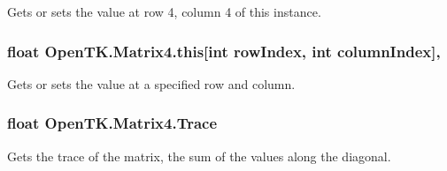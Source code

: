 Gets or sets the value at row 4, column 4 of this instance. 

\hypertarget{struct_open_t_k_1_1_matrix4_ae970446c132947e10f286d178faff5e4}{
\subsubsection[{this[int row\-Index, int column\-Index]}]{\setlength{\rightskip}{0pt plus 5cm}float Open\-T\-K.\-Matrix4.\-this\mbox{[}int row\-Index, int column\-Index\mbox{]}\hspace{0.3cm}{\ttfamily [get]}, {\ttfamily [set]}}}\label{struct_open_t_k_1_1_matrix4_ae970446c132947e10f286d178faff5e4}


Gets or sets the value at a specified row and column. 

\hypertarget{struct_open_t_k_1_1_matrix4_a0e8edded0f0459923d3943e43a5e72b2}{
\subsubsection[{Trace}]{\setlength{\rightskip}{0pt plus 5cm}float Open\-T\-K.\-Matrix4.\-Trace\hspace{0.3cm}{\ttfamily [get]}}}\label{struct_open_t_k_1_1_matrix4_a0e8edded0f0459923d3943e43a5e72b2}


Gets the trace of the matrix, the sum of the values along the diagonal. 

